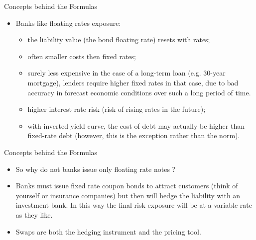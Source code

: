 \documentclass{beamer}
\newcommand{\goodcheck}{\color{green}\ding{52}}
\newcommand{\badcheck}{\color{red}\ding{56}}
\begin{document}
\begin{frame}{Concepts behind the Formulas}
	\begin{itemize}
		\item Banks like floating rates exposure: 
		\begin{itemize}
			\item [\goodcheck] the liability value (the bond floating rate) resets with rates;
			\item [\goodcheck] often smaller costs then fixed rates;
			\item [\goodcheck]surely less expensive in the case of a long-term loan (e.g. 30-year mortgage), lenders require higher fixed rates in that case, due to bad accuracy in forecast economic conditions over such a long period of time.
		\end{itemize}
		\begin{itemize}
			\item [\badcheck] higher interest rate risk (risk of rising rates in the future);
			\item [\badcheck] with inverted yield curve, the cost of debt may actually be higher than fixed-rate debt (however, this is the exception rather than the norm).
		\end{itemize}
	\end{itemize}
\end{frame}

\begin{frame}{Concepts behind the Formulas}
	\begin{itemize}
		\item So why do not banks issue only floating rate notes ?
		\item Banks must issue fixed rate coupon bonds to attract customers (think of yourself or insurance companies) but then will hedge the liability  with an investment bank. In this way the final risk exposure will be at a variable rate as they like. 
		\item Swaps are both the hedging instrument and the pricing tool.%
	\end{itemize}
\end{frame}
\end{document}
